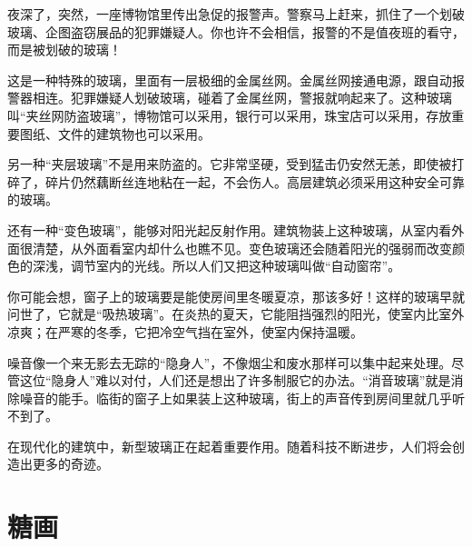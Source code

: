 \documentclass[12pt,UTF-8,openany]{ctexbook}
\begin{document}
\begin{large}
    
    夜深了，突然，一座博物馆里传出急促的报警声。警察马上赶来，抓住了一个划破玻璃、企图盗窃展品的犯罪嫌疑人。你也许不会相信，报警的不是值夜班的看守，而是被划破的玻璃！
    
    这是一种特殊的玻璃，里面有一层极细的金属丝网。金属丝网接通电源，跟自动报警器相连。犯罪嫌疑人划破玻璃，碰着了金属丝网，警报就响起来了。这种玻璃叫“夹丝网防盗玻璃”，博物馆可以采用，银行可以采用，珠宝店可以采用，存放重要图纸、文件的建筑物也可以采用。
    
    另一种“夹层玻璃”不是用来防盗的。它非常坚硬，受到猛击仍安然无恙，即使被打碎了，碎片仍然藕断丝连地粘在一起，不会伤人。高层建筑必须采用这种安全可靠的玻璃。
    
    还有一种“变色玻璃”，能够对阳光起反射作用。建筑物装上这种玻璃，从室内看外面很清楚，从外面看室内却什么也瞧不见。变色玻璃还会随着阳光的强弱而改变颜色的深浅，调节室内的光线。所以人们又把这种玻璃叫做“自动窗帘”。
    
    你可能会想，窗子上的玻璃要是能使房间里冬暖夏凉，那该多好！这样的玻璃早就问世了，它就是“吸热玻璃”。在炎热的夏天，它能阻挡强烈的阳光，使室内比室外凉爽；在严寒的冬季，它把冷空气挡在室外，使室内保持温暖。
    
    噪音像一个来无影去无踪的“隐身人”，不像烟尘和废水那样可以集中起来处理。尽管这位“隐身人”难以对付，人们还是想出了许多制服它的办法。“消音玻璃”就是消除噪音的能手。临街的窗子上如果装上这种玻璃，街上的声音传到房间里就几乎听不到了。
    
    在现代化的建筑中，新型玻璃正在起着重要作用。随着科技不断进步，人们将会创造出更多的奇迹。
    
\end{large}



\chapter{糖画}
\end{document}
